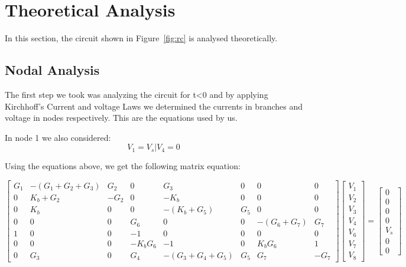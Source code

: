 \section{Theoretical Analysis}
\label{sec:analysis}

In this section, the circuit shown in Figure~\ref{fig:rc} is analysed
theoretically.

\subsection{Nodal Analysis}

The first step we took was analyzing the circuit for t<0 and by applying Kirchhoff's Current and voltage Laws we determined the currents in branches and voltage in nodes respectively. This are the equations used by us.

In node 1 we also considered:
\begin{equation}
	V_1 = V_s | V_4 = 0
\end{equation}


Using the equations above, we get the following matrix equation:

\begin{equation*}
	\begin{bmatrix}
		G_1 & -(G_1 + G_2 + G_3) & G_2 & 0 & G_3 & 0 & 0 & 0 \\ 
		0 & K_b + G_2 & -G_2 & 0 & -K_b & 0 & 0 & 0 \\
		0 & K_b & 0 & 0 & -(K_b + G_5) & G_5 & 0 & 0 \\ 
		0 & 0 & 0 & G_6 & 0 & 0 & -(G_6 + G_7) & G_7 \\
		1 & 0 & 0 & -1 & 0 & 0 & 0 & 0 \\
		0 & 0 & 0 & -K_bG_6 & -1 & 0 & K_bG_6 & 1 \\
		0 & G_3 & 0 & G_4 & -(G_3 + G_4 + G_5) & G_5 & G_7 & -G_7
	\end{bmatrix}
	\begin{bmatrix} V_1 \\ V_2 \\ V_3 \\ V_4 \\ V_6 \\ V_7 \\ V_8 \end{bmatrix}
	=
	\begin{bmatrix} 0 \\ 0 \\ 0 \\ 0 \\ V_s \\ 0 \\ 0 \end{bmatrix}
\end{equation*}

